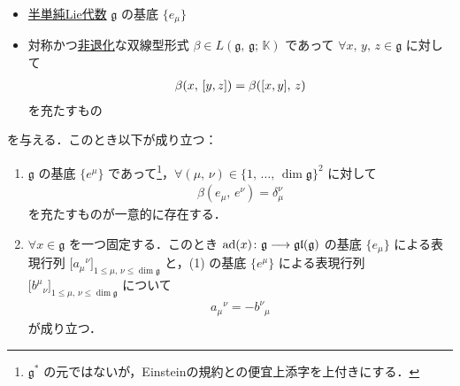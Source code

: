 \documentclass[rep_main]{subfiles}
\begin{document}
\begin{mylem}[label=lem:Casimir,breakable]{}
	\begin{itemize}
		\item \hyperref[de:semisimple-LieAlg]{半単純Lie代数} $\mathfrak{g}$ の基底 $\{e_\mu\}$
		\item 対称かつ\hyperref[def:radical-bilinear]{非退化}な双線型形式 $\beta \in L(\mathfrak{g},\, \mathfrak{g};\, \mathbb{K})$
		であって $\forall x,\, y,\, z \in \mathfrak{g}$ に対して
		\begin{align}
			\beta(x,\, \comm{y}{z}) = \beta (\comm{x}{y},\, z)
		\end{align}
		を充たすもの
	\end{itemize}
	を与える．このとき以下が成り立つ： 
	\begin{enumerate}
		\item 
		$\mathfrak{g}$ の基底 $\{e^\mu\}$ であって\footnote{$\mathfrak{g}^*$ の元ではないが，Einsteinの規約との便宜上添字を上付きにする．}，$\forall (\mu,\, \nu) \in \{1,\, \dots,\, \dim \mathfrak{g}\}^2$ に対して
		\begin{align}
			\beta(e_\mu,\, e^\nu) = \delta_{\mu}^{\nu}
		\end{align}
		を充たすものが一意的に存在する．
		\item $\forall x \in \mathfrak{g}$ を一つ固定する．このとき $\operatorname{ad}(x) \colon \mathfrak{g} \longrightarrow \mathfrak{gl} (\mathfrak{g})$ の基底 $\{e_\mu\}$ による表現行列 $\bigl[ a_\mu{}^\nu \bigr]_{1 \le \mu,\, \nu \le \dim \mathfrak{g}}$ と，(1) の基底 $\{e^\mu\}$ による表現行列 $\bigl[ b^\mu{}_\nu \bigr]_{1 \le \mu,\, \nu \le \dim \mathfrak{g}}$ について
		\begin{align}
			a_\mu{}^\nu = -b^\nu{}_\mu
		\end{align}
		が成り立つ．
	\end{enumerate}
\end{mylem}
\end{document}
